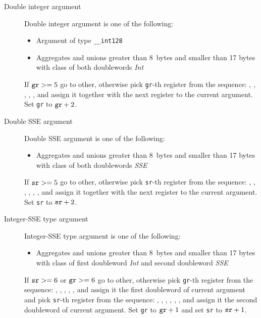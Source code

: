 \begin{description}
\begin{description}
    \item[Double integer argument]
      Double integer argument is one of the following:
      \begin{itemize}
        \item Argument of type \verb|__int128|
        \item Aggregates and unions greater than 8~bytes and smaller
          than 17 bytes with class of both doublewords \emph{Int}
      \end{itemize}
      If $\verb|gr| >= 5$ go to other, otherwise pick \verb|gr|-th register from
      the sequence: \RAX, \RDX, \RCX, \RBX, \RSI, \RDI{} and assign it together with the
      next register to the current argument.
      Set \verb|gr| to $\verb|gr|+2$.

    \item[Double SSE argument]
      Double SSE argument is one of the following:
      \begin{itemize}
        \item Aggregates and unions greater than 8~bytes and smaller
          than 17 bytes with class of both doublewords \emph{SSE}
      \end{itemize}
      If $\verb|sr| >= 5$ go to other, otherwise pick \verb|sr|-th
      register from the sequence: , , ,
      , , ,  and assign it
      together with the next register to the current argument.  Set
      \verb|sr| to $\verb|sr|+2$.

    \item[Integer-SSE type argument]
      Integer-SSE type argument is one of the following:
      \begin{itemize}
        \item Aggregates and unions greater than 8~bytes and smaller
          than 17 bytes with class of first doubleword \emph{Int}
          and second doubleword \emph{SSE}
      \end{itemize}
      If $\verb|sr| >= 6$ or $\verb|gr| >= 6$ go to other, otherwise
      pick \verb|gr|-th register from the sequence: \RAX, \RDX, \RCX,
      \RBX, \RSI, \RDI{} and assign it the first doubleword of current
      argument and pick \verb|sr|-th register from the sequence:
      , , , , ,
      ,  and assign it the second doubleword of current
      argument.  Set \verb|gr| to $\verb|gr|+1$ and set \verb|sr| to
      $\verb|sr|+1$.


\end{description}
\end{description}
